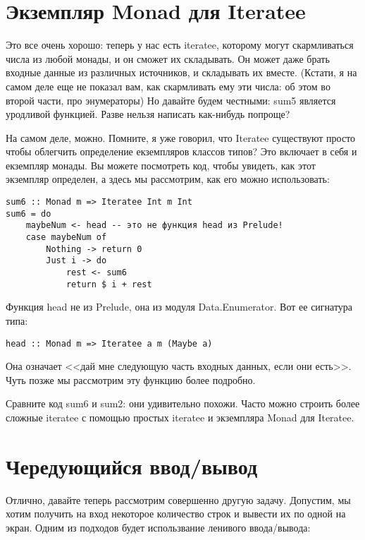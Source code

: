 \section{Экземпляр Monad для Iteratee}

Это все очень хорошо: теперь у нас есть iteratee, которому могут скармливаться числа из любой монады, и он сможет их складывать. Он может даже брать входные данные из различных источников, и складывать их вместе. (Кстати, я на самом деле еще не показал вам, как скармливать ему эти числа: об этом во второй части, про энумераторы) Но давайте будем честными: sum5 является уродливой функцией. Разве нельзя написать как-нибудь попроще?

На самом деле, можно. Помните, я уже говорил, что Iteratee существуют просто чтобы облегчить определение екземпляров классов типов? Это включает в себя и екземпляр монады. Вы можете посмотреть код, чтобы увидеть, как этот экземпляр определен, а здесь мы рассмотрим, как его можно использовать:

\begin{lstlisting}
sum6 :: Monad m => Iteratee Int m Int
sum6 = do
    maybeNum <- head -- это не функция head из Prelude!
    case maybeNum of
        Nothing -> return 0
        Just i -> do
            rest <- sum6
            return $ i + rest
\end{lstlisting}%

Функция head не из Prelude, она из модуля Data.Enumerator. Вот ее сигнатура типа:

\begin{lstlisting}
head :: Monad m => Iteratee a m (Maybe a)
\end{lstlisting}

Она означает <<дай мне следующую часть входных данных, если они есть>>. Чуть позже мы рассмотрим эту функцию более подробно.

Сравните код sum6 и sum2: они удивительно похожи. Часто можно строить более сложные iteratee с помощью простых iteratee и экземпляра Monad для Iteratee.

\section{Чередующийся ввод/вывод}

Отлично, давайте теперь рассмотрим совершенно другую задачу. Допустим, мы хотим получить на вход некоторое количество строк и вывести их по одной на экран. Одним из подходов будет использвание ленивого ввода/вывода:

